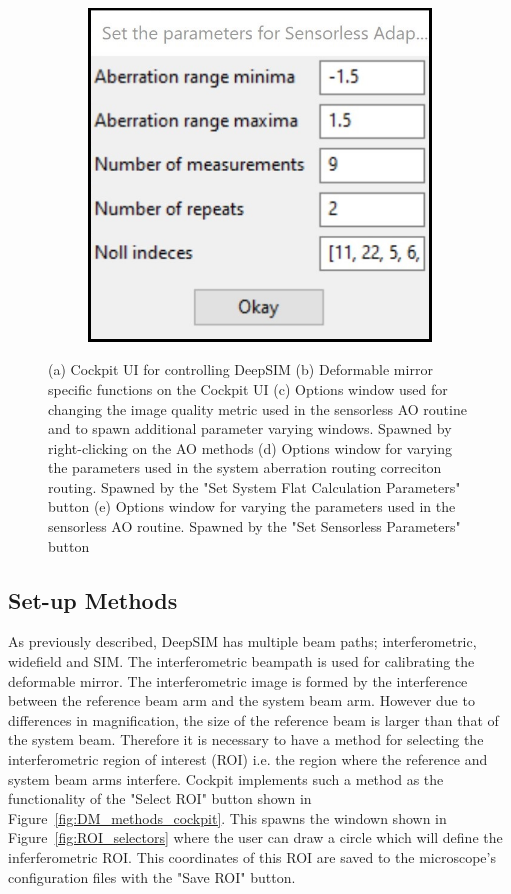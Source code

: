 \begin{figure}[H]
\begin{subfigure}{0.23\textwidth}
		\includegraphics[width=\linewidth]{images/sensorless_ao_parameters.jpg}
		\caption{}
		\label{fig:DM_sensorless_ao_parameters}
	\end{subfigure}
	\caption{(a) Cockpit UI for controlling DeepSIM (b) Deformable mirror specific functions on the Cockpit UI (c) Options window used for changing the image quality metric used in the sensorless AO routine and to spawn additional parameter varying windows. Spawned by right-clicking on the AO methods (d) Options window for varying the parameters used in the system aberration routing correciton routing. Spawned by the "Set System Flat Calculation Parameters" button (e) Options window for varying the parameters used in the sensorless AO routine. Spawned by the "Set Sensorless Parameters" button}
	\label{fig:Cockpit_UI}
\end{figure}

\subsection{Set-up Methods}
\label{subsec:set_up_methods}

As previously described, DeepSIM has multiple beam paths; interferometric, widefield and SIM. The interferometric beampath is used for calibrating the deformable mirror. The interferometric image is formed by the interference between the reference beam arm and the system beam arm. However due to differences in magnification, the size of the reference beam is larger than that of the system beam. Therefore it is necessary to have a method for selecting the interferometric region of interest (ROI) i.e. the region where the reference and system beam arms interfere. Cockpit implements such a method as the functionality of the "Select ROI" button shown in Figure~\ref{fig:DM_methods_cockpit}. This spawns the windown shown in Figure~\ref{fig:ROI_selectors} where the user can draw a circle which will define the inferferometric ROI. This coordinates of this ROI are saved to the microscope's configuration files with the "Save ROI" button.

